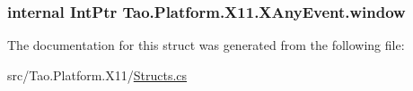 \label{struct_tao_1_1_platform_1_1_x11_1_1_x_any_event_a208b9bad10c608cdf800e361460a891d}
\hypertarget{struct_tao_1_1_platform_1_1_x11_1_1_x_any_event_ad08ed99cc92dde37693e394dacba3fe1}{
\subsubsection[{window}]{\setlength{\rightskip}{0pt plus 5cm}internal IntPtr {\bf Tao.Platform.X11.XAnyEvent.window}}}
\label{struct_tao_1_1_platform_1_1_x11_1_1_x_any_event_ad08ed99cc92dde37693e394dacba3fe1}


The documentation for this struct was generated from the following file:\begin{DoxyCompactItemize}
\item 
src/Tao.Platform.X11/\hyperlink{_structs_8cs}{Structs.cs}\end{DoxyCompactItemize}
